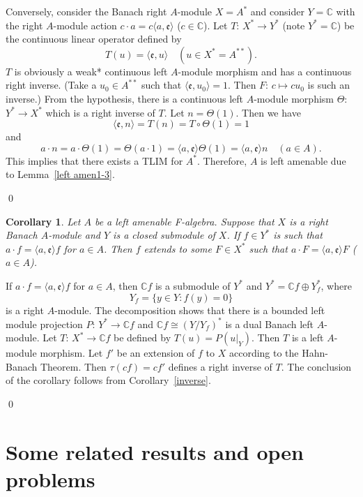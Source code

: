 \documentclass{tran-l}
\numberwithin{equation}{section}
\newtheorem{cor}[thm]{Corollary}
\theoremstyle{definition}
\theoremstyle{remark}
\begin{document}
Conversely, consider the Banach right $A$-module $X=A^*$ and consider $Y = {\mathbb{C}}$ with the right $A$-module action $c\cdot a =c {\langle} a, {\mathfrak{e}}{\rangle}$ ($c\in {\mathbb{C}}$). Let $T$: $X^*\to Y^*$ (note $Y^* = {\mathbb{C}}$) be the continuous linear operator defined by 
\[
T(u) = {\langle} {\mathfrak{e}}, u {\rangle}\quad (u\in X^* = A^{**}).
\]
 $T$ is obviously a weak* continuous left $A$-module morphism and has a continuous right inverse. (Take a $u_0\in A^{**}$ such that 
$ {\langle} {\mathfrak{e}}, u_0{\rangle} = 1$.
Then $F$: $c\mapsto cu_0$ is such an inverse.) From the hypothesis, there is a continuous left $A$-module morphism $\Theta$: $Y^*\to X^*$ which is a right inverse of $T$. Let $n =\Theta(1)$. Then we have 
  \[
  {\langle} {\mathfrak{e}}, n{\rangle} = T(n) =T\circ \Theta (1) =1
  \]
   and 
\[
a\cdot n = a\cdot \Theta(1) = \Theta (a\cdot 1) = {\langle} a, {\mathfrak{e}} {\rangle} \Theta(1) = {\langle} a, {\mathfrak{e}}{\rangle} n \quad (a\in A).
\]
This implies that there exists a TLIM for $A^*$.
Therefore, $A$ is left amenable due to Lemma~\ref{left amen1-3}.

\qed 

\begin{cor}\label{functional ext}
Let $ A$ be a left amenable F-algebra. Suppose that $X$ is a right Banach $ A$-module and $Y$ is a closed submodule of $X$. If $f\in Y^*$ is such that $a\cdot f = \langle a,{\mathfrak{e}} \rangle f$ for $a\in  A$. Then $f$ extends to some $F\in X^*$ such that $a\cdot F = \langle a,{\mathfrak{e}} \rangle F$ ($a\in  A$).
\end{cor}
\proof
If $a\cdot f = \langle a,{\mathfrak{e}} \rangle f$ for $a\in  A$, then $ {\mathbb{C}} f$ is a submodule of $Y^*$ and $Y^* =  {\mathbb{C}} f \oplus Y_f^*$, where 
\[
Y_f = \{y\in Y: f(y) = 0\}
\]
 is a right $ A$-module. The decomposition shows that there is a bounded left module projection $P$: $Y^* \to  {\mathbb{C}} f$ and $ {\mathbb{C}} f\cong (Y/Y_f)^*$ is a dual Banach left $ A$-module. Let $T$: $X^* \to  {\mathbb{C}} f$ be defined by $T(u) = P(u|_Y)$. Then $T$ is a left $ A$-module morphism. Let $f'$ be an extension of $f$ to $X$ according to the Hahn-Banach Theorem. Then $\tau(cf) = cf'$ defines a right inverse of $T$. The conclusion of the corollary follows from Corollary~\ref{inverse}.
 
\qed

\section{Some related results and open problems}\label{sec 6}
\end{document}
